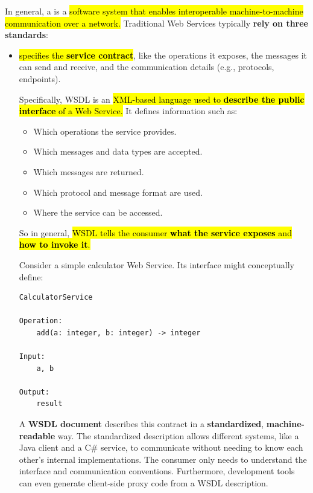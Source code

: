 \highspace
In general, a  is a \hl{software system that enables interoperable machine-to-machine communication over a network.} Traditional Web Services typically \textbf{rely on three standards}:
\begin{itemize}
    \item {} \hl{specifies the \textbf{service contract}}, like the operations it exposes, the messages it can send and receive, and the communication details (e.g., protocols, endpoints).

        Specifically, WSDL is an \hl{XML-based language used to \textbf{describe the public interface} of a Web Service.} It defines information such as:
        \begin{itemize}
            \item Which operations the service provides.
            \item Which messages and data types are accepted.
            \item Which messages are returned.
            \item Which protocol and message format are used.
            \item Where the service can be accessed.
        \end{itemize}
        So in general, \hl{WSDL tells the consumer \textbf{what the service exposes} and \textbf{how to invoke it}.}

        \begin{examplebox}
            Consider a simple calculator Web Service. Its interface might conceptually define:
\begin{lstlisting}
CalculatorService

Operation:
    add(a: integer, b: integer) -> integer

Input:
    a, b

Output:
    result
\end{lstlisting}
            A \textbf{WSDL document} describes this contract in a \textbf{standardized}, \textbf{machine-readable} way. The standardized description allows different systems, like a Java client and a C\# service, to communicate without needing to know each other's internal implementations. The consumer only needs to understand the interface and communication conventions. Furthermore, development tools can even generate client-side proxy code from a WSDL description.
        \end{examplebox}


\end{itemize}

